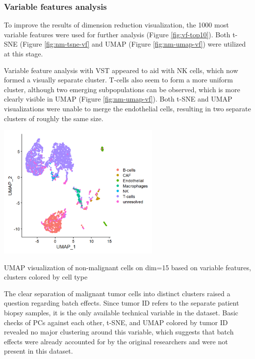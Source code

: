 \documentclass[11pt]{article}
\begin{document}

\begin{multicols}{2}

    \subsubsection{Variable features analysis}
    \noindent
    To improve the results of dimension reduction visualization, the 1000 most variable features were used for further analysis (Figure \ref{fig:vf-top10}). Both t-SNE (Figure \ref{fig:nm-tsne-vf} and UMAP (Figure \ref{fig:nm-umap-vf}) were utilized at this stage.

    Variable feature analysis with VST appeared to aid with NK cells, which now formed a visually separate cluster. T-cells also seem to form a more uniform cluster, although two emerging subpopulations can be observed, which is more clearly visible in UMAP (Figure \ref{fig:nm-umap-vf}). Both t-SNE and UMAP visualizations were unable to merge the endothelial cells, resulting in two separate clusters of roughly the same size.

    \begin{center}
        \captionsetup{type=figure}
        \includegraphics[width=8cm]{plots/plot_nm-umap-vf-cell.png}
        \caption{UMAP visualization of non-malignant cells on dim=15 based on variable features, clusters colored by cell type}
        \label{fig:nm-umap-vf}
    \end{center}

    The clear separation of malignant tumor cells into distinct clusters raised a question regarding batch effects. Since tumor ID refers to the separate patient biopsy samples, it is the only available technical variable in the dataset. Basic checks of PCs against each other, t-SNE, and UMAP colored by tumor ID revealed no major clustering around this variable, which suggests that batch effects were already accounted for by the original researchers and were not present in this dataset.



\end{multicols}
\end{document}
